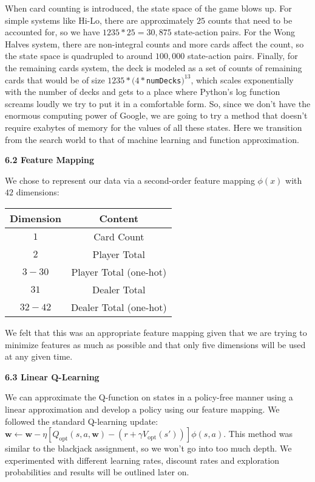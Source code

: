 \documentclass[12pt]{article}
\begin{document}
	When card counting is introduced, the state space of the game blows up. For simple systems like Hi-Lo, there are approximately $25$ counts that need to be accounted for, so we have $1235 * 25 = 30,875$ state-action pairs. For the Wong Halves system, there are non-integral counts and more cards affect the count, so the state space is quadrupled to around $100,000$ state-action pairs. Finally, for the remaining cards system, the deck is modeled as a set of counts of remaining cards that would be of size $1235 * (4 * $\texttt{numDecks}$)^{13}$, which scales exponentially with the number of decks and gets to a place where Python’s log function screams loudly we try to put it in a comfortable form. So, since we don't have the enormous computing power of Google, we are going to try a method that doesn’t require exabytes of memory for the values of all these states. Here we transition from the search world to that of machine learning and function approximation. \newline 
    
    \textbf{6.2 Feature Mapping} \newline 

	We chose to represent our data via a second-order feature mapping $\phi(x)$ with $42$ dimensions: 
    
    \begin{center}\begin{tabular}{|c|c|} 
    	\hline Dimension & Content \\
        \hline $1$ & Card Count \\
        \hline $2$ & Player Total \\
        \hline $3-30$ & Player Total (one-hot) \\ 
        \hline $31$ & Dealer Total \\ 
        \hline $32-42$ & Dealer Total (one-hot) \\
        \hline
    \end{tabular}\end{center}
    
    We felt that this was an appropriate feature mapping given that we are trying to minimize features as much as possible and that only five dimensions will be used at any given time. \newline 
    
    \textbf{6.3 Linear Q-Learning} \newline 
    
    We can approximate the Q-function on states in a policy-free manner using a linear approximation and develop a policy using our feature mapping. We followed the standard Q-learning update: $\textbf{w} \leftarrow \textbf{w} - \eta[Q_{\text{opt}}(s, a, \textbf{w}) - (r + \gamma V_{\text{opt}}(s'))]\phi(s, a)$. This method was similar to the blackjack assignment, so we won't go into too much depth. We experimented with different learning rates, discount rates and exploration probabilities and results will be outlined later on. \newline 
    
\end{document}
